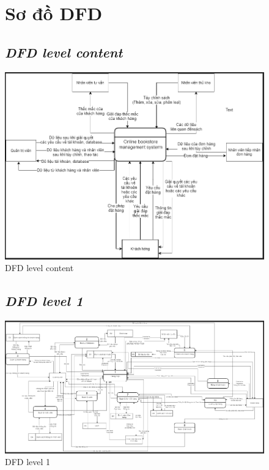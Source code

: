 \documentclass{report}
\begin{document}
\begin{figure}[htp]
    \section{Sơ đồ DFD}
    \subsection{\textit{DFD level content}}
    \centering
    \includegraphics[scale = 0.8]{image/content.PNG}
    \caption{DFD level content}
\end{figure}

\begin{figure}[htp]
    \subsection{\textit{DFD level 1}}
    \centering
    \includegraphics[scale = 0.6]{image/DFD_level1.PNG}
    \caption{DFD level 1}
\end{figure}
\end{document}
